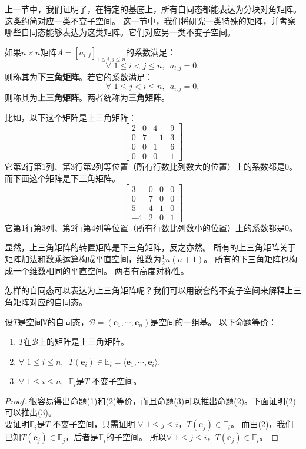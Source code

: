\documentclass[12pt,UTF8]{ctexbook}
\begin{document}
上一节中，我们证明了，在特定的基底上，所有自同态都能表达为分块对角矩阵。这类约简对应一类不变子空间。
这一节中，我们将研究一类特殊的矩阵，并考察哪些自同态能够表达为这类矩阵。它们对应另一类不变子空间。

\begin{df}\label{df:6_3}
    如果$n\times n$矩阵$A = [a_{i,j}]_{1 \leqslant i , j \leqslant n}$的系数满足：
    $$ \forall \,\, 1 \leqslant i < j \leqslant n, \,\,\, a_{i,j} = 0,$$
    则称其为\textbf{下三角矩阵}。若它的系数满足：
    $$ \forall \,\, 1 \leqslant j < i \leqslant n, \,\,\, a_{i,j} = 0,$$
    则称其为\textbf{上三角矩阵}。两者统称为\textbf{三角矩阵}。
\end{df}

比如，以下这个矩阵是上三角矩阵：
$$ \begin{bmatrix} 2 & 0 & 4 & 9 \\ 0 & 7 & -1 & 3 \\ 0 & 0 & 1 & 6 \\ 0 & 0 & 0 & 1\end{bmatrix}$$
它第2行第1列、第3行第2列等位置（所有行数比列数大的位置）上的系数都是0。而下面这个矩阵是下三角矩阵。
$$ \begin{bmatrix} 3 & 0 & 0 & 0 \\ 0 & 7 & 0 & 0 \\ 5 & 4 & 1 & 0 \\ -4 & 2 & 0 & 1\end{bmatrix}$$
它第1行第3列、第2行第4列等位置（所有行数比列数小的位置）上的系数都是0。

显然，上三角矩阵的转置矩阵是下三角矩阵，反之亦然。
所有的上三角矩阵关于矩阵加法和数乘运算构成平直空间，维数为$\frac12 n(n+1)$。
所有的下三角矩阵也构成一个维数相同的平直空间。
两者有高度对称性。

怎样的自同态可以表达为上三角矩阵呢？我们可以用嵌套的不变子空间来解释上三角矩阵对应的自同态。
\begin{pp}\label{pp:6_5}
    设$T$是空间$\mathbb{V}$的自同态，$\mathcal{B} = (\mathbf{e}_1, \cdots , \mathbf{e}_n)$是空间的一组基。
    以下命题等价：
    \begin{enumerate}
        \item $T$在$\mathcal{B}$上的矩阵是上三角矩阵。
        \item $\forall \,\, 1 \leqslant i \leqslant n, \,\,\, T(\mathbf{e}_i) \in \mathbb{E}_i = \langle \mathbf{e}_1, \cdots , \mathbf{e}_i\rangle .$
        \item $\forall \,\, 1 \leqslant i \leqslant n, \,\,\, \mathbb{E}_i $是$T$-不变子空间。
    \end{enumerate}
\end{pp}
\begin{proof} %
    很容易得出命题(1)和(2)等价，而且命题(3)可以推出命题(2)。下面证明(2)可以推出(3)。\\
    要证明$\mathbb{E}_i $是$T$-不变子空间，只需证明
    $\forall \,\, 1 \leqslant j \leqslant i$，$T(\mathbf{e}_j) \in \mathbb{E}_i$。
    而由(2)，我们已知$T(\mathbf{e}_j) \in \mathbb{E}_j$，后者是$\mathbb{E}_i$的子空间。
    所以$\forall \,\, 1 \leqslant j \leqslant i$，$T(\mathbf{e}_j) \in \mathbb{E}_i$。
    
\end{proof}
\end{document}
